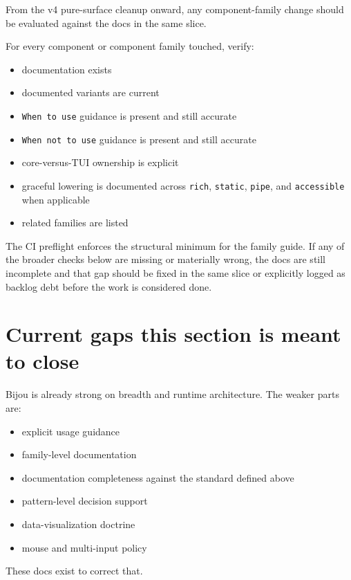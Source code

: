From the v4 pure-surface cleanup onward, any component-family change should be evaluated against the docs in the same slice.

For every component or component family touched, verify:

\begin{itemize}
\tightlist
\item
  documentation exists
\item
  documented variants are current
\item
  \texttt{W\allowbreak{}h\allowbreak{}e\allowbreak{}n\allowbreak{} \allowbreak{}t\allowbreak{}o\allowbreak{} \allowbreak{}u\allowbreak{}s\allowbreak{}e} guidance is present and still accurate
\item
  \texttt{W\allowbreak{}h\allowbreak{}e\allowbreak{}n\allowbreak{} \allowbreak{}n\allowbreak{}o\allowbreak{}t\allowbreak{} \allowbreak{}t\allowbreak{}o\allowbreak{} \allowbreak{}u\allowbreak{}s\allowbreak{}e} guidance is present and still accurate
\item
  core-versus-TUI ownership is explicit
\item
  graceful lowering is documented across \texttt{r\allowbreak{}i\allowbreak{}c\allowbreak{}h}, \texttt{s\allowbreak{}t\allowbreak{}a\allowbreak{}t\allowbreak{}i\allowbreak{}c}, \texttt{p\allowbreak{}i\allowbreak{}p\allowbreak{}e}, and \texttt{a\allowbreak{}c\allowbreak{}c\allowbreak{}e\allowbreak{}s\allowbreak{}s\allowbreak{}i\allowbreak{}b\allowbreak{}l\allowbreak{}e} when applicable
\item
  related families are listed
\end{itemize}

The CI preflight enforces the structural minimum for the family guide. If any of the broader checks below are missing or materially wrong, the docs are still incomplete and that gap should be fixed in the same slice or explicitly logged as backlog debt before the work is considered done.

\section{Current gaps this section is meant to close}\label{record-017-current-gaps-this-section-is-meant-to-close}

Bijou is already strong on breadth and runtime architecture. The weaker parts are:

\begin{itemize}
\tightlist
\item
  explicit usage guidance
\item
  family-level documentation
\item
  documentation completeness against the standard defined above
\item
  pattern-level decision support
\item
  data-visualization doctrine
\item
  mouse and multi-input policy
\end{itemize}

These docs exist to correct that.

